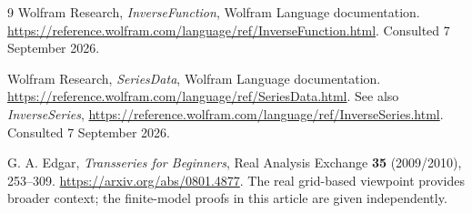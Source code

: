 \documentclass[11pt,a4paper]{article}
\numberwithin{equation}{section}
\theoremstyle{definition}
\begin{document}
\begin{thebibliography}{9}
Wolfram Research, \emph{InverseFunction}, Wolfram Language documentation.
\url{https://reference.wolfram.com/language/ref/InverseFunction.html}.
Consulted 7 September 2026.

Wolfram Research, \emph{SeriesData}, Wolfram Language documentation.
\url{https://reference.wolfram.com/language/ref/SeriesData.html}.
See also \emph{InverseSeries},
\url{https://reference.wolfram.com/language/ref/InverseSeries.html}.
Consulted 7 September 2026.

G. A. Edgar, \emph{Transseries for Beginners},
Real Analysis Exchange \textbf{35} (2009/2010), 253--309.
\url{https://arxiv.org/abs/0801.4877}.
The real grid-based viewpoint provides broader context; the finite-model
proofs in this article are given independently.
\end{thebibliography}
\end{document}
